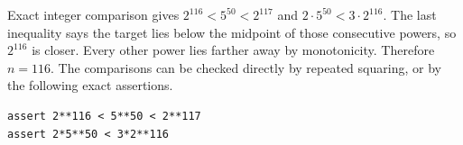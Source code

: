 Exact integer comparison gives $2^{116}<5^{50}<2^{117}$ and $2\cdot5^{50}<3\cdot2^{116}$. The last inequality says the target lies below the midpoint of those consecutive powers, so $2^{116}$ is closer. Every other power lies farther away by monotonicity. Therefore $\boxed{n=116}$. The comparisons can be checked directly by repeated squaring, or by the following exact assertions.\begin{verbatim}
assert 2**116 < 5**50 < 2**117
assert 2*5**50 < 3*2**116
\end{verbatim}
